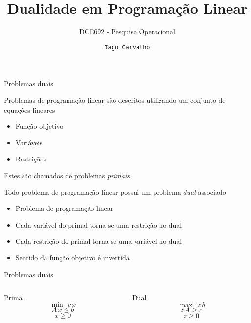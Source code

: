 \documentclass[compress,mathserif]{beamer}
\title{Dualidade em Programação Linear}
\subtitle{DCE692 - Pesquisa Operacional}
\author{\texttt{Iago Carvalho}}
\institute{\texttt{Departamento de Ciência da Computação}}
\begin{document}
\begin{frame}
\titlepage

\end{frame}


\begin{frame}{Problemas duais}

Problemas de programação linear são descritos utilizando um conjunto de equações lineares
\begin{itemize}
    \item Função objetivo
    \item Variáveis
    \item Restrições
\end{itemize}

Estes são chamados de problemas \textit{primais}

\vspace{0.5cm}

Todo problema de programação linear possui um problema \textit{dual} associado
\begin{itemize}
    \item Problema de programação linear
    \item Cada variável do primal torna-se uma restrição no dual
    \item Cada restrição do primal torna-se uma variável no dual
    \item Sentido da função objetivo é invertida
\end{itemize}
\end{frame}


\begin{frame}{Problemas duais}

\begin{columns}[T]
    \begin{column}{.44\textwidth}
        \centering Primal
        $$\min~~c\,x$$
        $$A\,x \leq b$$
        $$x \geq 0$$
    \end{column}
    \begin{column}{.49\textwidth}
        \centering Dual
        $$ \max~~z\,b $$
            $$ z\,A \geq c$$
            $$ z \geq 0 $$
    \end{column}
\end{columns}
\end{frame}

\end{document}
